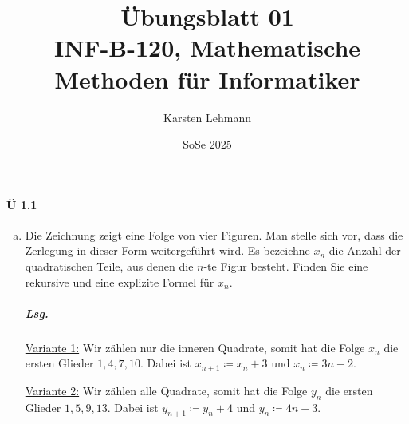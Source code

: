\documentclass{scrreprt}
\author{Karsten Lehmann}
\date{SoSe 2025}
\title{Übungsblatt 01\\INF-B-120, Mathematische Methoden für Informatiker}
\begin{document}
\paragraph{Ü 1.1}
\begin{enumerate}[(a)]
\item Die Zeichnung zeigt eine Folge von vier Figuren.
  Man stelle sich vor, dass die Zerlegung in dieser Form weitergeführt wird.
  Es bezeichne $x_n$ die Anzahl der quadratischen Teile, aus denen die $n$-te
  Figur besteht.
  Finden Sie eine rekursive und eine explizite Formel für $x_n$.

  \begin{minipage}{.15\textwidth}
  \end{minipage}
  \begin{minipage}{.15\textwidth}
  \end{minipage}
  \begin{minipage}{.15\textwidth}
  \end{minipage}
  \begin{minipage}{.15\textwidth}
  \end{minipage}

  \subparagraph{Lsg.} \underline{Variante 1:} Wir zählen nur die inneren
  Quadrate, somit hat die Folge $x_n$ die ersten Glieder $1, 4, 7, 10$.
  Dabei ist $x_{n + 1} \coloneqq x_n + 3$ und $x_n \coloneqq 3n - 2$.

  \underline{Variante 2:} Wir zählen alle Quadrate, somit hat die Folge $y_n$ die
  ersten Glieder $1, 5, 9, 13$.
  Dabei ist $y_{n + 1} \coloneqq y_n + 4$ und $y_n \coloneqq 4n - 3$.



\end{enumerate}
\end{document}
